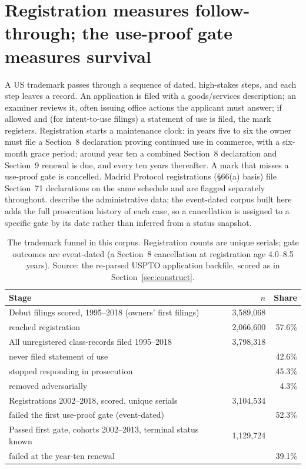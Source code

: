 \section{Registration measures follow-through; the use-proof gate measures survival}\label{sec:life}

A US trademark passes through a sequence of dated, high-stakes steps, and
each step leaves a record. An application is filed with a goods/services
description; an examiner reviews it, often issuing office actions the
applicant must answer; if allowed and (for intent-to-use filings) a
statement of use is filed, the mark registers. Registration starts a
maintenance clock: in years five to six the owner must file a Section~8
declaration proving continued use in commerce, with a six-month grace
period; around year ten a combined Section~8 declaration and Section~9
renewal is due, and every ten years thereafter. A mark that misses a
use-proof gate is cancelled. Madrid Protocol registrations
(\S66(a) basis) file Section~71 declarations on the same schedule and
are flagged separately throughout. \citet{Graham2013} describe the
administrative data; the event-dated corpus built here adds the full
prosecution history of each case, so a cancellation is assigned to a
specific gate by its date rather than inferred from a status snapshot.

\begin{table}[h]\centering\small
\caption{The trademark funnel in this corpus. Registration counts are
unique serials; gate outcomes are event-dated (a Section~8 cancellation
at registration age 4.0--8.5 years). Source: the re-parsed USPTO
application backfile, scored as in Section~\ref{sec:construct}.}
\label{tab:funnel}
\begin{tabular}{lrr}
\toprule
Stage & $n$ & Share \\
\midrule
Debut filings scored, 1995--2018 (owners' first filings) & 3{,}589{,}068 & \\
\quad reached registration & 2{,}066{,}600 & 57.6\% \\
\midrule
All unregistered class-records filed 1995--2018 & 3{,}798{,}318 & \\
\quad never filed statement of use & & 42.6\% \\
\quad stopped responding in prosecution & & 45.3\% \\
\quad removed adversarially & & 4.3\% \\
\midrule
Registrations 2002--2018, scored, unique serials & 3{,}104{,}534 & \\
\quad failed the first use-proof gate (event-dated) & & 52.3\% \\
\midrule
Passed first gate, cohorts 2002--2013, terminal status known & 1{,}129{,}724 & \\
\quad failed at the year-ten renewal & & 39.1\% \\
\bottomrule
\end{tabular}
\end{table}


